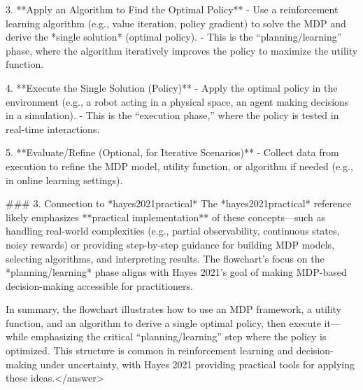3. **Apply an Algorithm to Find the Optimal Policy**  
   - Use a reinforcement learning algorithm (e.g., value iteration, policy gradient) to solve the MDP and derive the *single solution* (optimal policy).  
   - This is the “planning/learning” phase, where the algorithm iteratively improves the policy to maximize the utility function.  

4. **Execute the Single Solution (Policy)**  
   - Apply the optimal policy in the environment (e.g., a robot acting in a physical space, an agent making decisions in a simulation).  
   - This is the “execution phase,” where the policy is tested in real-time interactions.  

5. **Evaluate/Refine (Optional, for Iterative Scenarios)**  
   - Collect data from execution to refine the MDP model, utility function, or algorithm if needed (e.g., in online learning settings).  


### 3. Connection to *hayes2021practical*  
The *hayes2021practical* reference likely emphasizes **practical implementation** of these concepts—such as handling real-world complexities (e.g., partial observability, continuous states, noisy rewards) or providing step-by-step guidance for building MDP models, selecting algorithms, and interpreting results. The flowchart’s focus on the *planning/learning* phase aligns with Hayes 2021’s goal of making MDP-based decision-making accessible for practitioners.  


In summary, the flowchart illustrates how to use an MDP framework, a utility function, and an algorithm to derive a single optimal policy, then execute it—while emphasizing the critical “planning/learning” step where the policy is optimized. This structure is common in reinforcement learning and decision-making under uncertainty, with Hayes 2021 providing practical tools for applying these ideas.</answer>